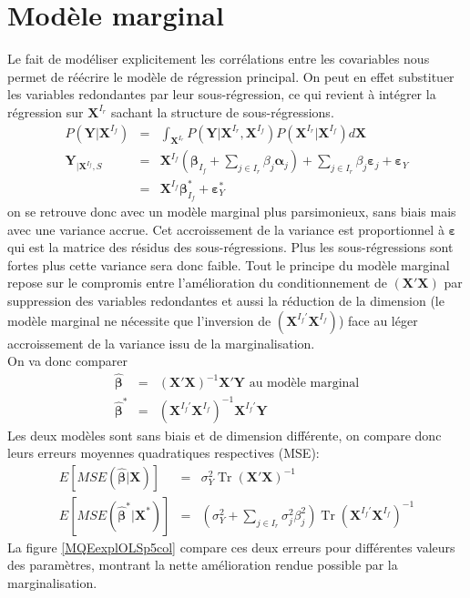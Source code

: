 \documentclass[12pt,a4paper]{report}
\begin{document}
	\section{Modèle marginal}
	Le fait de modéliser explicitement les corrélations entre les covariables nous permet de réécrire le modèle de régression principal. On peut en effet substituer les variables redondantes par leur sous-régression, ce qui revient à intégrer la régression sur $\boldsymbol{X}^{I_r}$ sachant la structure de sous-régressions.
\begin{eqnarray}
		P(\boldsymbol{Y}|\boldsymbol{X}^{I_f})&=& \int_{\boldsymbol{X}^{I_r}}P(\boldsymbol{Y}|\boldsymbol{X}^{I_r},\boldsymbol{X}^{I_f})P(\boldsymbol{X}^{I_r}|\boldsymbol{X}^{I_f}) d \boldsymbol{X} \\
	\boldsymbol{Y}_{|\boldsymbol{X}^{I_f},S}&=&\boldsymbol{X}^{I_f} (\boldsymbol{\beta}_{I_f}+ \sum_{j \in I_r}\beta_{j}\boldsymbol{\alpha}_j)+  \sum_{j \in I_r}\beta_{j}\boldsymbol{\varepsilon}_j+\boldsymbol{\varepsilon}_Y  \\
	&=&\boldsymbol{X}^{I_f}\boldsymbol{\beta}_{I_f}^*+\boldsymbol{\varepsilon}_Y^*
\end{eqnarray}
on se retrouve donc avec un modèle marginal plus parsimonieux, sans biais mais avec une variance accrue. Cet accroissement de la variance est proportionnel à $\boldsymbol{\varepsilon}$ qui est la matrice des résidus des sous-régressions. Plus les sous-régressions sont fortes plus cette variance sera donc faible.
Tout le principe du modèle marginal repose sur le compromis entre l'amélioration du conditionnement de $(\boldsymbol{X}'\boldsymbol{X})$ par suppression des variables redondantes et aussi la réduction de la dimension (le modèle marginal ne nécessite que l'inversion de $(\boldsymbol{X}^{I_f'}\boldsymbol{X}^{I_f})$) face au léger accroissement de la variance issu de la marginalisation. \\
On va donc comparer 
	\begin{eqnarray}
		\hat{\boldsymbol{\beta}}&=& (\boldsymbol{X}'\boldsymbol{X})^{-1}\boldsymbol{X}'\boldsymbol{Y} \textrm{ au modèle marginal} \\
		\hat{\boldsymbol{\beta}}^*&=& (\boldsymbol{X}^{I_f'}\boldsymbol{X}^{I_f})^{-1}\boldsymbol{X}^{I_f'}\boldsymbol{Y}
	\end{eqnarray}
	Les deux modèles sont sans biais et de dimension différente, on compare donc leurs erreurs moyennes quadratiques respectives (MSE):
	\begin{eqnarray}
		E[MSE(\hat{\boldsymbol{\beta}}|\boldsymbol{X})]&=& \sigma^2_Y \operatorname{Tr}(\boldsymbol{X}'\boldsymbol{X})^{-1}  \\
		E[MSE(\hat{\boldsymbol{\beta}}^*|\boldsymbol{X}^*)]&=& (\sigma^2_Y+\sum_{j \in I_r}\sigma^2_{j}\beta_{j}^2)\operatorname{Tr}(\boldsymbol{X}^{I_f'}\boldsymbol{X}^{I_f})^{-1}
	\end{eqnarray}
		La figure \ref{MQEexplOLSp5col} compare ces deux erreurs pour différentes valeurs des paramètres, montrant la nette amélioration rendue possible par la marginalisation.
	
\end{document}
